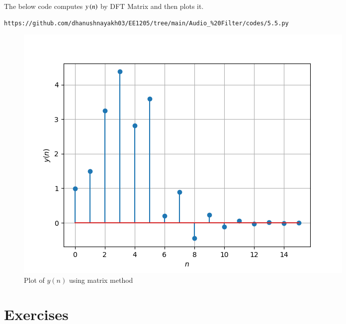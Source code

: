 \documentclass[journal,12pt,twocolumn]{IEEEtran}
\theoremstyle{remark}
\renewcommand\thesection{\arabic{section}}
\numberwithin{equation}{subsection}
\begin{document}
\begin{enumerate}[label=\thesection.\arabic*]
The below code computes $y\left(n\right)$ by DFT Matrix and then plots it.
\begin{lstlisting}
https://github.com/dhanushnayakh03/EE1205/tree/main/Audio_%20Filter/codes/5.5.py
\end{lstlisting}
\begin{figure}[!h]
    \centering
    \includegraphics[width = \columnwidth]{figs/6.5.png}
    \caption{Plot of $y(n)$ using matrix method}
    \label{fig:enter-la}
\end{figure}
\end{enumerate}
\section{Exercises}
\end{document}
